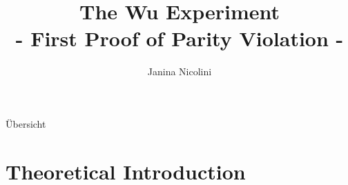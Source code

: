 \documentclass[aspectratio=1610, 10pt]{beamer}
\title{The Wu Experiment\\
- First Proof of Parity Violation -}
\author[J.~Nicolini]{Janina Nicolini}
\institute[Key experiments]{presentation for key experiments seminar \\ Physics Department}
\begin{document}
\maketitle

\begin{frame}{Übersicht}
	\begin{Large}
  	\tableofcontents
	\end{Large}
\end{frame}

\section{Theoretical Introduction}
\end{document}
